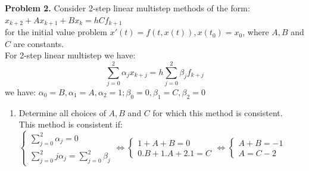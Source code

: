 \documentclass[14pt,a4paper]{article}
\begin{document}
\label{Problem 2}
\large\textbf{Problem 2.} Consider 2-step linear multistep methods of the form:\\
\hspace*{5cm} $x_{k+2} + Ax_{k+1} + Bx_k = hCf_{k+1}$\\
for the initial value problem $x'(t) = f(t,x(t)), x(t_0) = x_0$, where $A,B$ and $C$ are constants.\\
For 2-step linear multistep we have: 
$$ \sum_{j=0}^{2} \alpha_jx_{k+j} = h\sum_{j=0}^{2}\beta_jf_{k+j}$$
we have: $\alpha_0 = B, \alpha_1 = A, \alpha_2 = 1; \beta_0 = 0, \beta_1 = C, \beta_2 = 0$
\begin{enumerate}
	\label{2a} 
	\item Determine all choices of $A,B$ and $C$ for which this method is consistent.\\
	This method is consistent if:
	\\$\begin{cases} \sum_{j=0}^{2} \alpha_j = 0 \\ \sum_{j=0}^{2} j\alpha_j = \sum_{j=0}^{2} \beta_j \end{cases} \Leftrightarrow \begin{cases} 1 + A + B = 0 \\ 0.B + 1.A + 2.1 = C \end{cases} \Leftrightarrow \begin{cases} A + B = -1 \\ A = C-2 \end{cases}$\\
		

\end{enumerate}
\end{document}
